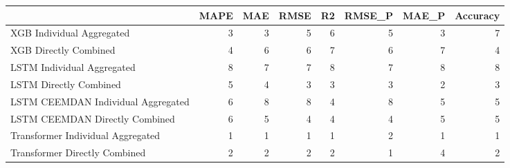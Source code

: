 \begin{tabular}{lrrrrrrr}
\toprule
{} &  MAPE &  MAE &  RMSE &  R2 &  RMSE\_P &  MAE\_P &  Accuracy \\
\midrule
XGB Individual Aggregated          &     3 &    3 &     5 &   6 &       5 &      3 &         7 \\
XGB Directly Combined              &     4 &    6 &     6 &   7 &       6 &      7 &         4 \\
LSTM Individual Aggregated         &     8 &    7 &     7 &   8 &       7 &      8 &         8 \\
LSTM Directly Combined             &     5 &    4 &     3 &   3 &       3 &      2 &         3 \\
LSTM CEEMDAN Individual Aggregated &     6 &    8 &     8 &   4 &       8 &      5 &         5 \\
LSTM CEEMDAN Directly Combined     &     6 &    5 &     4 &   4 &       4 &      5 &         5 \\
Transformer Individual Aggregated  &     1 &    1 &     1 &   1 &       2 &      1 &         1 \\
Transformer Directly Combined      &     2 &    2 &     2 &   2 &       1 &      4 &         2 \\
\bottomrule
\end{tabular}

